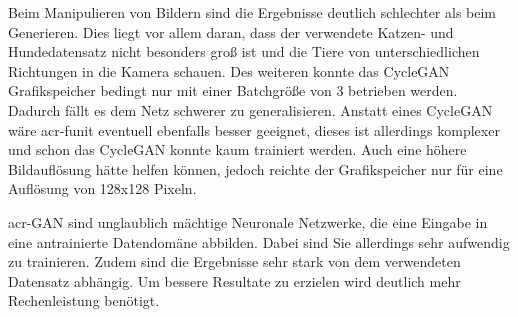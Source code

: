 Beim Manipulieren von Bildern sind die Ergebnisse deutlich schlechter als beim Generieren. 
Dies liegt vor allem daran, dass der verwendete Katzen- und Hundedatensatz nicht 
besonders groß ist und die Tiere von unterschiedlichen Richtungen in die Kamera schauen. 
Des weiteren konnte das CycleGAN Grafikspeicher bedingt nur mit einer Batchgröße von 3 
betrieben werden. Dadurch fällt es dem Netz schwerer zu generalisieren. Anstatt eines 
CycleGAN wäre \gls{acr-funit} eventuell ebenfalls besser geeignet, dieses ist allerdings 
komplexer und schon das CycleGAN konnte kaum trainiert werden. Auch eine höhere 
Bildauflösung hätte helfen können, jedoch reichte der Grafikspeicher nur für eine 
Auflösung von 128x128 Pixeln.

\gls{acr-GAN} sind unglaublich mächtige Neuronale Netzwerke, die eine Eingabe in eine 
antrainierte Datendomäne abbilden. Dabei sind Sie allerdings sehr aufwendig zu trainieren. 
Zudem sind die Ergebnisse sehr stark von dem verwendeten Datensatz abhängig. Um 
bessere Resultate zu erzielen wird deutlich mehr Rechenleistung benötigt.





